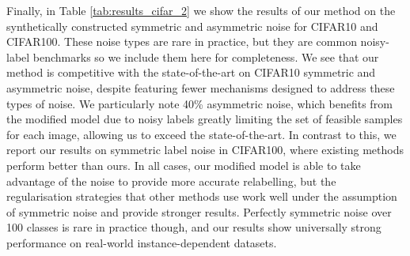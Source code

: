 \documentclass[10pt,twocolumn,letterpaper]{article}
\begin{document}
Finally, in Table \ref{tab:results_cifar_2} we show the results of our method on the synthetically constructed symmetric and asymmetric noise for CIFAR10 and CIFAR100. These noise types are rare in practice, but they are common noisy-label benchmarks so we include them here for completeness. We see that our method is competitive with the state-of-the-art on CIFAR10 symmetric and asymmetric noise, despite featuring fewer mechanisms designed to address these types of noise. We particularly note 40\% asymmetric noise, which benefits from the modified model due to noisy labels greatly limiting the set of feasible samples for each image, allowing us to exceed the state-of-the-art. In contrast to this, we report our results on symmetric label noise in CIFAR100, where existing methods perform better than ours. In all cases, our modified model is able to take advantage of the noise to provide more accurate relabelling, but the regularisation strategies that other methods use work well under the assumption of symmetric noise and provide stronger results. Perfectly symmetric noise over 100 classes is rare in practice though, and our results show universally strong performance on real-world instance-dependent datasets.
\end{document}
